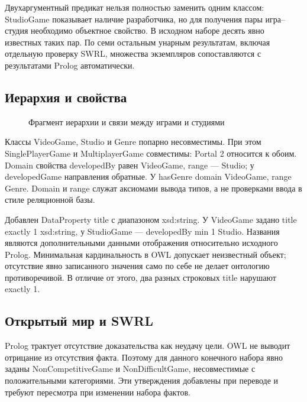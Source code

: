 Двухаргументный предикат нельзя полностью заменить одним классом: StudioGame
показывает наличие разработчика, но для получения пары игра--студия необходимо
объектное свойство. В исходном наборе десять явно известных таких пар.
По семи остальным унарным результатам, включая отдельную проверку SWRL,
множества экземпляров сопоставляются с результатами Prolog автоматически.

\subsection{Иерархия и свойства}
\begin{figure}[H]\centering
{}
\caption{Фрагмент иерархии и связи между играми и студиями}
\end{figure}
Классы VideoGame, Studio и Genre попарно несовместимы. При этом SinglePlayerGame
и MultiplayerGame совместимы: Portal 2 относится к обоим. Domain свойства developedBy
равен VideoGame, range --- Studio; у developedGame направления обратные.
У hasGenre domain VideoGame, range Genre. Domain и range служат аксиомами вывода
типов, а не проверками ввода в стиле реляционной базы.

Добавлен DataProperty title с диапазоном xsd:string. У VideoGame задано
title exactly 1 xsd:string, у StudioGame --- developedBy min 1 Studio.
Названия являются дополнительными данными отображения относительно исходного Prolog.
Минимальная кардинальность в OWL допускает неизвестный объект; отсутствие
явно записанного значения само по себе не делает онтологию противоречивой.
В отличие от этого, два разных строковых title нарушают exactly 1.

\subsection{Открытый мир и SWRL}
Prolog трактует отсутствие доказательства как неудачу цели. OWL не выводит
отрицание из отсутствия факта. Поэтому для данного конечного набора явно
заданы NonCompetitiveGame и NonDifficultGame, несовместимые с положительными
категориями. Эти утверждения добавлены при переводе и требуют пересмотра
при изменении набора фактов.

